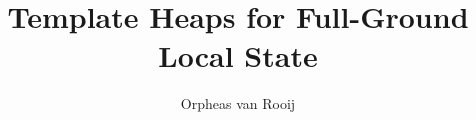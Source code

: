 \documentclass{article}
\theoremstyle{definition}
\theoremstyle{definition}
\theoremstyle{definition}
\theoremstyle{remark}
\theoremstyle{definition}
\theoremstyle{remark}
\theoremstyle{proof}
\begin{document}
\title{Template Heaps for Full-Ground Local State}
\author{Orpheas van Rooij}

\maketitle





\printbibliography
\end{document}
